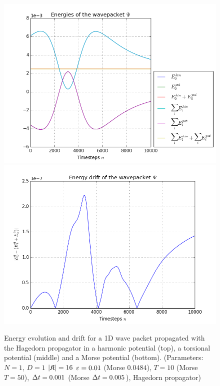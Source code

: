 \begin{figure}[ht]
	\includegraphics[width=.45\textwidth]{figures/morse_1D_Hagedorn_energies.png}
	\includegraphics[width=.45\textwidth]{figures/morse_1D_Hagedorn_drift.png}
	\caption{Energy evolution and drift for a 1D wave packet propagated with the Hagedorn propagator in a harmonic potential (top), a torsional potential (middle) and a Morse potential (bottom).
	(Parameters: $N=1$, $D=1$ $|\mathfrak{K}|=16$ $\varepsilon=0.01$ (Morse $0.0484$), $T=10$ (Morse $T=50$), $\Delta t=0.001$ (Morse $\Delta t=0.005$), Hagedorn propagator)}
	\label{fig:energy_Hagedorn}
\end{figure}
%
